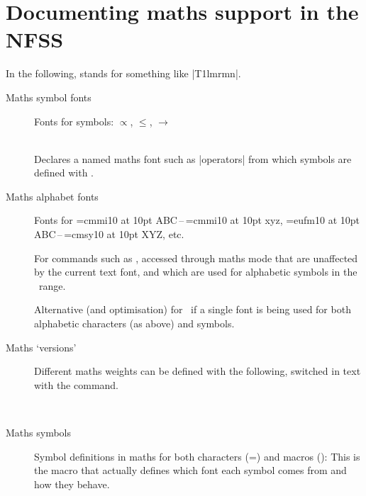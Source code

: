 
\section{Documenting maths support in the NFSS}

In the following,  stands for something like |{T1}{lmr}{m}{n}|.

\begin{description}
\item[Maths symbol fonts] Fonts for symbols: $\propto$, $\leq$, $\rightarrow$

\cmd\DeclareSymbolFont{}\\
Declares a named maths font such as |operators| from which symbols are defined with \cmd\DeclareMathSymbol.

\item[Maths alphabet fonts] Fonts for {\font\1=cmmi10 at 10pt\1 ABC}\,–\,{\font\1=cmmi10 at 10pt\1 xyz}, {\font\1=eufm10 at 10pt\1 ABC}\,–\,{\font\1=cmsy10 at 10pt\1 XYZ}, etc.

\cmd\DeclareMathAlphabet{}

For commands such as \cmd\mathbf, accessed
through maths mode that are unaffected by the current text font, and which are used for
alphabetic symbols in the \ascii\ range.

\cmd\DeclareSymbolFontAlphabet{}

Alternative (and optimisation) for \cmd\DeclareMathAlphabet\ if a single font is being used
for both alphabetic characters (as above) and symbols.

\item[Maths `versions'] Different maths weights can be defined with the following, switched
in text with the \cmd\mathversion{} command.

\cmd\SetSymbolFont{}\\
\cmd\SetMathAlphabet{}

\item[Maths symbols] Symbol definitions in maths for both characters (=) and macros (\cmd\eqdef):
\cmd\DeclareMathSymbol{}
This is the macro that actually defines which font each symbol comes from and how they behave.
\end{description}

